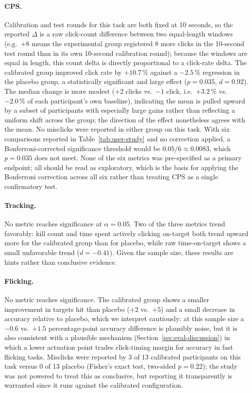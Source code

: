 \paragraph{CPS.} Calibration and test rounds for this task are both fixed at
10 seconds, so the reported $\Delta$ is a raw click-count difference between
two equal-length windows (e.g.\ $+8$ means the experimental group registered
8 more clicks in the 10-second test round than in its own 10-second
calibration round); because the windows are equal in length, this count delta
is directly proportional to a click-rate delta. The calibrated group improved
click rate by $+10.7\,\%$ against a $-2.5\,\%$ regression in the placebo
group, a statistically significant and large effect ($p=0.035$, $d=0.92$).
The median change is more modest ($+2$ clicks vs.\ $-1$ click, i.e.\
$+3.2\,\%$ vs.\ $-2.0\,\%$ of each participant's own baseline), indicating
the mean is pulled upward by a subset of participants with especially large
gains rather than reflecting a uniform shift across the group; the direction
of the effect nonetheless agrees with the mean. No misclicks were reported in
either group on this task. With six
comparisons reported in Table~\ref{tab:user-study} and no correction applied,
a Bonferroni-corrected significance threshold would be $0.05/6 \approx 0.0083$,
which $p=0.035$ does not meet. None of the six metrics was pre-specified as a
primary endpoint; all should be read as exploratory, which is the basis for
applying the Bonferroni correction across all six rather than treating CPS as
a single confirmatory test.

\paragraph{Tracking.} No metric reaches significance at $\alpha=0.05$. Two of
the three metrics trend favorably: kill count and time spent actively clicking
on-target both trend upward more for the calibrated group than for placebo,
while raw time-on-target shows a small unfavorable trend ($d=-0.41$).
Given the sample size, these results are hints rather than conclusive evidence.

\paragraph{Flicking.} No metric reaches significance. The calibrated group
shows a smaller improvement in targets hit than placebo ($+2$ vs.\ $+5$) and a
small decrease in accuracy relative to placebo, which we interpret cautiously:
at this sample size a $-0.6$ vs.\ $+1.5$ percentage-point accuracy difference
is plausibly noise, but it is also consistent with a plausible mechanism
(Section~\ref{sec:eval-discussion}) in which a lower actuation point trades
click-timing margin for accuracy in fast flicking tasks. Misclicks were
reported by 3 of 13 calibrated participants on this task versus 0 of 13
placebo (Fisher's exact test, two-sided $p=0.22$); the study was not powered
to treat this as conclusive, but reporting it transparently is warranted
since it runs against the calibrated configuration.

